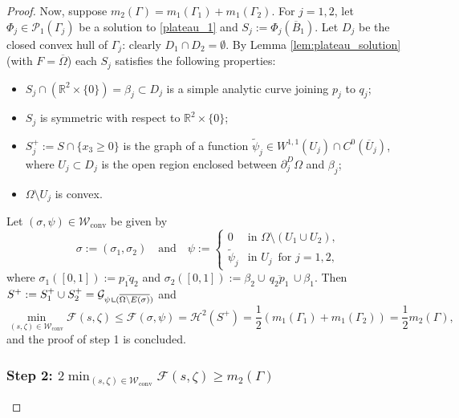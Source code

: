 \documentclass[11pt]{article}
\numberwithin{equation}{section}
\newcommand{\R}{\mathbb{R}}
\let\Om\Omega
\newcommand\admclassconv{{\mathcal W_\mathrm{conv}}}
\newcommand{\resa}{\mathop{\hbox{\vrule height 7pt width 0.5pt depth 0pt
\vrule height 0.5pt width 6pt depth 0pt}}\nolimits}
\newcommand{\resb}{\mathop{\hbox{\vrule height 4pt width 0.5pt depth 0pt
\vrule height 0.5pt width 3pt depth 0pt}}\nolimits}
\newcommand{\res}{\mathchoice{\resa}{\resa}{\resb}{\resb}}
\theoremstyle{definition}
\begin{document}
\begin{proof}
Now, suppose $m_2(\Gamma)=m_1(\Gamma_1)+m_1(\Gamma_2)$.
For $j=1,2$,
let $\Phi_j\in \mathcal{P}_1(\Gamma_j)$ be a solution to \eqref{plateau_1}
and $S_j:=\Phi_j(\overline B_1)$.
Let $D_j$ be the closed convex hull of $\Gamma_j$: clearly $D_1\cap D_2=\emptyset$. By Lemma \ref{lem:plateau_solution} (with $F=\overline\Om$) each $S_j$ satisfies the following properties:
\begin{itemize}
\item $S_j\cap(\R^2\times\{0\})=\beta_j\subset D_j$ is a simple {analytic} curve joining $p_j$ to $q_j$;
\item $S_j$ is symmetric with respect to $\R^2\times\{0\}$;
\item $S_j^+:=S\cap\{x_3\ge0\}$ is the graph of a function $\widetilde \psi_j\in W^{1,1}(U_j)\cap C^0(\overline U_j)$, where $U_j\subset D_j$ is the open region enclosed between $\partial^D_j\Om$ and $\beta_j$;
\item
$\Om\setminus U_j$ is convex.
\end{itemize}
Let $(\sigma,\psi)\in\admclassconv$ be given by
\begin{equation*}
\sigma:=(\sigma_1,\sigma_2)\quad\text{and}\quad\psi:=\begin{cases}
0&\text{in } \Om\setminus (U_1\cup U_2),\\
\widetilde{\psi}_j&\text{in } U_j\, \text{ for }j=1,2,
\end{cases}
\end{equation*}
where $\sigma_1([0,1]):=\overline{p_1q_2}$
and $\sigma_2([0,1]):=\beta_2\cup\,\overline{q_2p_1}\,\cup\beta_1$.
Then $S^+:=S^+_1\cup S^+_2=\mathcal{G}_{\psi\res(\overline{\Om\setminus E(\sigma)})}$ and
\begin{equation*}
\min_{(s,\zeta)\in\admclassconv}\mathcal{F}(s,\zeta)\le \mathcal{F}(\sigma,\psi)=\mathcal{H}^2(S^+)=\frac12(m_1(\Gamma_1)+m_1(\Gamma_2))=\frac12m_2(\Gamma),
\end{equation*}
and the proof of step 1 is concluded.

\subsubsection*{Step 2:
$2\min_{(s,\zeta)\in \admclassconv}\mathcal F(s,\zeta)\ge m_2(\Gamma)$}


\end{proof}
\end{document}
